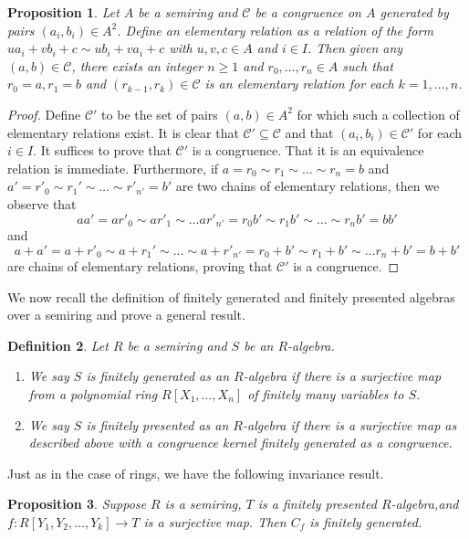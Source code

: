 \documentclass[notitlepage, 10pt]{article}
\theoremstyle{defin}
\newtheorem{defn}{Definition}
\theoremstyle{theo}
\newtheorem{prop}[defn]{Proposition}
\theoremstyle{rema}
\newcommand{\cC}{\mathcal{C}}
\begin{document}
\begin{prop}
    \label{p:definingconggen}
    Let $A$ be a semiring and $\cC$ be a congruence on $A$ generated by pairs $(a_i, b_i)\in A^2$. Define an elementary relation as a relation of the form $ua_i+vb_i+c\sim ub_i+va_i+c$ with $u,v,c\in A$ and $i\in I$. Then given any $(a,b)\in \cC$, there exists an integer $n\geq 1$ and $r_0,\ldots, r_n \in A$ such that $r_0=a, r_1=b$ and $(r_{k-1}, r_{k})\in \cC$ is an elementary relation for each $k=1,\ldots, n$.
\end{prop}

\begin{proof}
    Define $\cC'$ to be the set of pairs $(a,b)\in A^2$ for which such a collection of elementary relations exist. It is clear that $\cC'\subseteq \cC$ and that $(a_i,b_i)\in \cC'$ for each $i\in I$. It suffices to prove that $\cC'$ is a congruence. That it is an equivalence relation is immediate. Furthermore, if $a = r_0\sim r_1\sim \ldots \sim r_n = b$ and $a' = r'_0\sim r_1'\sim \ldots \sim r'_{n'} = b'$ are two chains of elementary relations, then we observe that
    $$aa' = ar'_0 \sim ar'_1 \sim \ldots ar'_{n'} = r_0b' \sim r_1b' \sim \ldots \sim r_nb' =  bb'$$
    and 
    $$a+a' = a+r'_0 \sim a+r_1'\sim \ldots \sim a + r'_{n'} = r_0 +b' \sim r_1 + b'\sim \ldots r_n+b'=b+b'$$
    are chains of elementary relations, proving that $\cC'$ is a congruence.
\end{proof}

We now recall the definition of finitely generated and finitely presented algebras over a semiring and prove a general result. 

\begin{defn}\label{df2}
    Let $R$ be a semiring and $S$ be an $R$-algebra.
    \begin{enumerate}
        \item We say $S$ is \textit{finitely generated as an $R$-algebra} if there is a surjective map from a polynomial ring $R[X_1,\ldots,X_n]$ of finitely many variables to $S$.
        \item We say $S$ is \textit{finitely presented as an $R$-algebra} if there is a surjective map as described above with a congruence kernel finitely generated as a congruence.
    \end{enumerate}
\end{defn}

Just as in the case of rings, we have the following invariance result.

\begin{prop}
    \label{p3} Suppose $R$ is a semiring, $T$ is a finitely presented $R$-algebra,and $f : R[Y_1,Y_2,\ldots,Y_k] \to T$ is a surjective map. Then $C_f$ is finitely generated. 
\end{prop}
\end{document}
